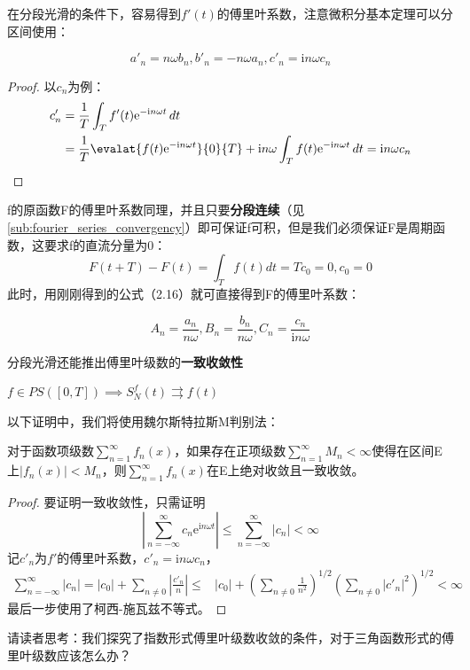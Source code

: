 在分段光滑的条件下，容易得到$f'(t)$的傅里叶系数，注意微积分基本定理可以分区间使用：
\begin{proposition}[导函数的傅里叶系数]
    \begin{equation*}
    a'_n=n\omega b_n,b'_n=-n\omega a_n,c'_n=\mathrm{i}n\omega c_n
\end{equation*}
\end{proposition}
\begin{proof}
    以$c_n$为例：
\begin{align*}
    c'_n & =\frac{1}{T}\int_{T}f'(t)\mathrm{e}^{-\mathrm{i}n\omega t}\,dt\\
         & =\frac{1}{T}\evalat{f(t)\mathrm{e}^{-\mathrm{i}n\omega t}}{0}{T}+\mathrm{i}n\omega\int_{T}f(t)\mathrm{e}^{-\mathrm{i}n\omega t}\,dt=\mathrm{i}n\omega c_n
\end{align*}
\end{proof}

f的原函数F的傅里叶系数同理，并且只要\textbf{分段连续}（见\ref{sub:fourier_series_convergency}）即可保证f可积，但是我们必须保证F是周期函数，这要求f的直流分量为0：
\[F(t+T)-F(t)=\int_{T}f(t)dt=Tc_0=0,c_0=0\]
此时，用刚刚得到的公式（2.16）就可直接得到F的傅里叶系数：
\begin{proposition}[原函数的傅里叶系数]
    \begin{equation*}
    A_n=\frac{a_n}{n\omega},B_n=\frac{b_n}{n\omega},C_n=\frac{c_n}{\mathrm{i}n\omega}
\end{equation*}
\end{proposition}

分段光滑还能推出傅里叶级数的\textbf{一致收敛性}
\begin{theorem}
$f\in PS([0,T])\implies S_N^f(t)\rightrightarrows f(t)$
\end{theorem}
以下证明中，我们将使用魏尔斯特拉斯M判别法：
\begin{theorem}[M判别法]
    对于函数项级数$\sum_{n=1}^{\infty}f_n(x)$，如果存在正项级数$\sum_{n=1}^{\infty}M_n<\infty$使得在区间E上$|f_n(x)|<M_n$，则$\sum_{n=1}^{\infty}f_n(x)$在E上绝对收敛且一致收敛。
\end{theorem}
\begin{proof}
    要证明一致收敛性，只需证明
    $$\left|\sum_{n=-\infty}^{\infty}c_n \mathrm{e}^{\mathrm{i}n\omega t}\right|\leq \sum_{n=-\infty}^{\infty}|c_n|<\infty$$
    记$c'_n$为$f'$的傅里叶系数，$c'_n =\mathrm{i}n\omega c_n$，
    \begin{align*}
    \sum_{n=-\infty}^{\infty}|c_n|=|c_0|+\sum_{n\neq 0}\left| \frac{c'_n}{n}\right|\leq & |c_0|+\left(\sum_{n\neq 0}\frac{1}{n^2}\right)^{1/2}\left(\sum_{n\neq 0}|c'_n|^2\right)^{1/2}<\infty
\end{align*}
最后一步使用了柯西-施瓦兹不等式。
\end{proof}

请读者思考：我们探究了指数形式傅里叶级数收敛的条件，对于三角函数形式的傅里叶级数应该怎么办？
